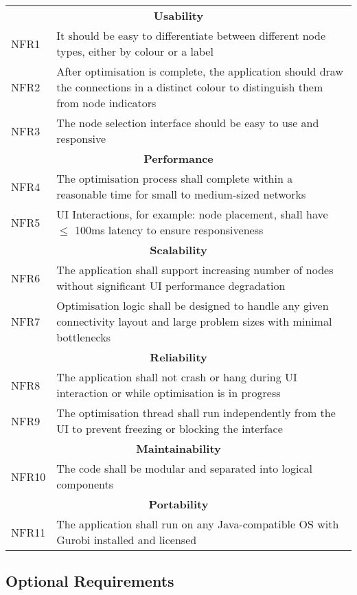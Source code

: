\begin{longtable}{l p{13cm}}
\multicolumn{2}{c}{\textbf{Usability}}\\
NFR1 & It should be easy to differentiate between different node types, either by colour or a label\\
NFR2 & After optimisation is complete, the application should draw the connections in a distinct colour to distinguish them from node indicators\\
NFR3 & The node selection interface should be easy to use and responsive\\
\midrule
\multicolumn{2}{c}{\textbf{Performance}}\\
NFR4 & The optimisation process shall complete within a reasonable time for small to medium-sized networks\\
NFR5 & UI Interactions, for example: node placement, shall have $\leq$ 100ms latency to ensure responsiveness\\
\midrule
\multicolumn{2}{c}{\textbf{Scalability}}\\
NFR6 & The application shall support increasing number of nodes without significant UI performance degradation\\
NFR7 & Optimisation logic shall be designed to handle any given connectivity layout and large problem sizes with minimal bottlenecks\\
\midrule
\multicolumn{2}{c}{\textbf{Reliability}}\\
NFR8 & The application shall not crash or hang during UI interaction or while optimisation is in progress\\
NFR9 & The optimisation thread shall run independently from the UI to prevent freezing or blocking the interface\\
\midrule
\multicolumn{2}{c}{\textbf{Maintainability}}\\
NFR10 & The code shall be modular and separated into logical components\\
\midrule
\multicolumn{2}{c}{\textbf{Portability}}\\
NFR11 & The application shall run on any Java-compatible OS with Gurobi installed and licensed\\
\end{longtable}


\subsection{Optional Requirements}\label{optionalrequirements}

